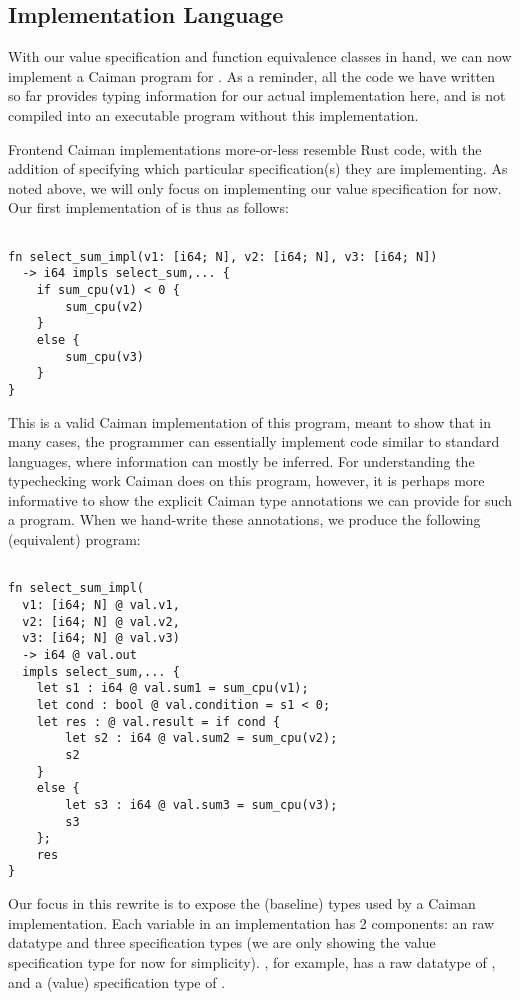 \subsection{Implementation Language}
\label{subsec:implementation}

With our value specification and function equivalence classes in hand, we can now implement a Caiman program for .  As a reminder, all the code we have written so far provides typing information for our actual implementation here, and is not compiled into an executable program without this implementation.

Frontend Caiman implementations more-or-less resemble Rust code, with the addition of specifying which particular specification(s) they are implementing.  As noted above, we will only focus on implementing our value specification for now.  Our first implementation of  is thus as follows:
%
\begin{lstlisting}

fn select_sum_impl(v1: [i64; N], v2: [i64; N], v3: [i64; N]) 
  -> i64 impls select_sum,... {
    if sum_cpu(v1) < 0 { 
        sum_cpu(v2)
    }
    else {
        sum_cpu(v3)
    }
}
\end{lstlisting}
%
This is a valid Caiman implementation of this program, meant to show that in many cases, the programmer can essentially implement code similar to standard languages, where information can mostly be inferred.  For understanding the typechecking work Caiman does on this program, however, it is perhaps more informative to show the explicit Caiman type annotations we can provide for such a program.  When we hand-write these annotations, we produce the following (equivalent) program:
%
\begin{lstlisting}

fn select_sum_impl(
  v1: [i64; N] @ val.v1,
  v2: [i64; N] @ val.v2,
  v3: [i64; N] @ val.v3)
  -> i64 @ val.out
  impls select_sum,... {
    let s1 : i64 @ val.sum1 = sum_cpu(v1);
    let cond : bool @ val.condition = s1 < 0;
    let res : @ val.result = if cond {
        let s2 : i64 @ val.sum2 = sum_cpu(v2);
        s2
    }
    else {
        let s3 : i64 @ val.sum3 = sum_cpu(v3);
        s3
    };
    res
}
\end{lstlisting}
%
Our focus in this rewrite is to expose the (baseline) types used by a Caiman implementation.  Each variable in an implementation has 2 components: an raw datatype and three specification types (we are only showing the value specification type for now for simplicity).  , for example, has a raw datatype of , and a (value) specification type of .

